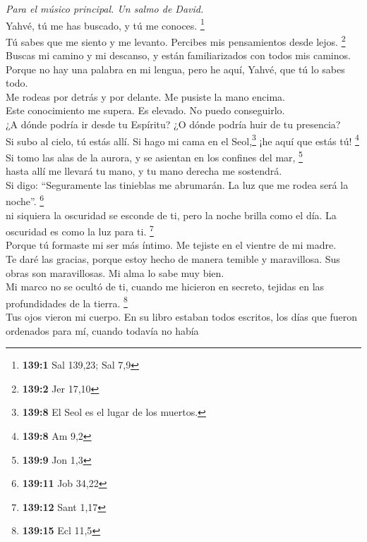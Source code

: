 \emph{Para el músico principal. Un salmo de David.}\\
 Yahvé, tú me has buscado, y tú me conoces. \footnote{\textbf{139:1}
  Sal 139,23; Sal 7,9}\\
 Tú sabes que me siento y me levanto. Percibes mis
pensamientos desde lejos. \footnote{\textbf{139:2} Jer 17,10}\\
 Buscas mi camino y mi descanso, y están familiarizados
con todos mis caminos.\\
 Porque no hay una palabra en mi lengua, pero he aquí,
Yahvé, que tú lo sabes todo.\\
 Me rodeas por detrás y por delante. Me pusiste la mano
encima.\\
 Este conocimiento me supera. Es elevado. No puedo
conseguirlo.\\
 ¿A dónde podría ir desde tu Espíritu? ¿O dónde podría
huir de tu presencia?\\
 Si subo al cielo, tú estás allí. Si hago mi cama en el
Seol,\footnote{\textbf{139:8} El Seol es el lugar de los muertos.} ¡he
aquí que estás tú! \footnote{\textbf{139:8} Am 9,2}\\
 Si tomo las alas de la aurora, y se asientan en los
confines del mar, \footnote{\textbf{139:9} Jon 1,3}\\
 hasta allí me llevará tu mano, y tu mano derecha me
sostendrá.\\
 Si digo: ``Seguramente las tinieblas me abrumarán. La
luz que me rodea será la noche''. \footnote{\textbf{139:11} Job 34,22}\\
 ni siquiera la oscuridad se esconde de ti, pero la noche
brilla como el día. La oscuridad es como la luz para ti. \footnote{\textbf{139:12}
  Sant 1,17}\\
 Porque tú formaste mi ser más íntimo. Me tejiste en el
vientre de mi madre.\\
 Te daré las gracias, porque estoy hecho de manera
temible y maravillosa. Sus obras son maravillosas. Mi alma lo sabe muy
bien.\\
 Mi marco no se ocultó de ti, cuando me hicieron en
secreto, tejidas en las profundidades de la tierra. \footnote{\textbf{139:15}
  Ecl 11,5}\\
 Tus ojos vieron mi cuerpo. En su libro estaban todos
escritos, los días que fueron ordenados para mí, cuando todavía no había
